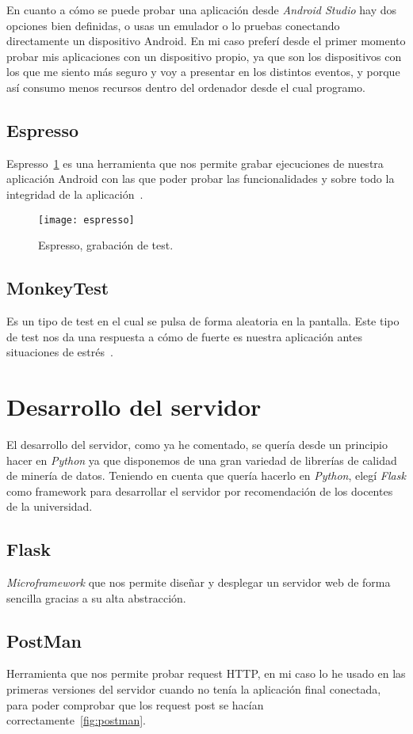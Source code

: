 En cuanto a cómo se puede probar una aplicación desde \textit{Android Studio} hay dos opciones bien definidas, o usas un emulador o lo pruebas conectando directamente un dispositivo Android. En mi caso preferí desde el primer momento probar mis aplicaciones con un dispositivo propio, ya que son los dispositivos con los que me siento más seguro y voy a presentar en los distintos eventos, y porque así consumo menos recursos dentro del ordenador desde el cual programo.
\subsection{Espresso}
Espresso~\ref{fig:espresso} es una herramienta que nos permite grabar ejecuciones de nuestra aplicación Android con las que poder probar las funcionalidades y sobre todo la integridad de la aplicación~\cite{espresso}.

\begin{figure}
	\centering
	\texttt{[image: espresso]}
	\caption{Espresso, grabación de test.}
	\label{fig:espresso}
\end{figure}
\subsection{MonkeyTest}
Es un tipo de test en el cual se pulsa de forma aleatoria en la pantalla. Este tipo de test nos da una respuesta a cómo de fuerte es nuestra aplicación antes situaciones de estrés~\cite{monkeytest}.
\section{Desarrollo del servidor}
El desarrollo del servidor, como ya he comentado, se quería desde un principio hacer en \textit{Python} ya que disponemos de una gran variedad de librerías de calidad de minería de datos. Teniendo en cuenta que quería hacerlo en \textit{Python}, elegí \textit{Flask} como framework para desarrollar el servidor por recomendación de los docentes de la universidad.

\subsection{Flask}
\textit{Microframework} que nos permite diseñar y desplegar un servidor web de forma sencilla gracias a su alta abstracción.

\subsection{PostMan}
Herramienta que nos permite probar request HTTP, en mi caso lo he usado en las primeras versiones del servidor cuando no tenía la aplicación final conectada, para poder comprobar que los request post se hacían correctamente~\ref{fig:postman}.

